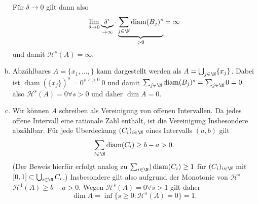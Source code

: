 \documentclass{article}
\newcommand{\diam}{\operatorname{diam}}
\begin{document}
\begin{enumerate}[(a)]
\[        \]
        Für $\delta \to 0$ gilt dann also 
        \[
            \lim\limits_{\delta \to 0} \underbrace{\delta^\epsilon}_{\to \infty} \cdot \underbrace{\sum_{j \in \N} \diam(B_j)^s}_{>0} = \infty
        \]
        und damit $\mathscr H^s(A) = \infty$.
        \item Abzählbares $A = \{x_1,\dots, \}$ kann dargestellt werden als $A = \bigcup_{j\in \N} \{x_j\}$. Dabei ist $\diam(\{x_j\}) ^s = 0^s \overset{s > 0}{=} 0$ und damit $\sum_{j \in \N} \diam(B_j)^s = \sum_{j \in \N} 0 = 0$, also $\mathscr H^s(A) = 0 \forall s > 0$ und daher $\dim A = 0$.
        \item Wir können $A$ schreiben als Vereinigung von offenen Intervallen. Da jedes offene Intervall eine rationale Zahl enthält, ist die Vereinigung Insbesondere abzählbar. Für jede Überdeckung $(C_i)_{i\in \N}$ eines Intervalls $(a,b)$ gilt
        \[
            \sum_{i \in \N} \diam(C_i) \geq b-a > 0.
        \] (Der Beweis hierfür erfolgt analog zu $\sum_{i\in \N}) \diam(C_i) \geq 1$ für $(C_i)_{i\in \N}$ mit $[0,1] \subset \bigcup_{i\in \N} C_i$.)
        Insbesondere gilt also aufgrund der Monotonie von $\mathscr H^s$ $\mathscr H^1(A) \geq b-a > 0$. Wegen $\mathscr H^s (A) = 0 \forall s > 1$ gilt daher \[\dim A = \inf \{s \geq 0 \colon \mathscr H^s(A) = 0\} = 1.\]
    \end{enumerate}
\end{document}
